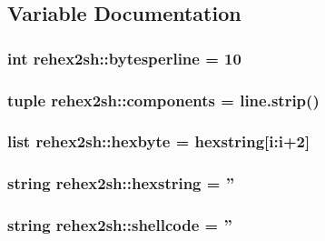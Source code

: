 \subsection{\-Variable \-Documentation}
\hypertarget{namespacerehex2sh_a6871a6d428039f71f95e8fafadae894e}{
\subsubsection[{bytesperline}]{\setlength{\rightskip}{0pt plus 5cm}int {\bf rehex2sh\-::bytesperline} = 10}}\label{namespacerehex2sh_a6871a6d428039f71f95e8fafadae894e}
\hypertarget{namespacerehex2sh_a46d30aa0b79379b0ae46b60e57e3a36b}{
\subsubsection[{components}]{\setlength{\rightskip}{0pt plus 5cm}tuple {\bf rehex2sh\-::components} = line.\-strip()}}\label{namespacerehex2sh_a46d30aa0b79379b0ae46b60e57e3a36b}
\hypertarget{namespacerehex2sh_aac23a21b6bd08055ad23d4b30b34367b}{
\subsubsection[{hexbyte}]{\setlength{\rightskip}{0pt plus 5cm}list {\bf rehex2sh\-::hexbyte} = {\bf hexstring}\mbox{[}i\-:i+2\mbox{]}}}\label{namespacerehex2sh_aac23a21b6bd08055ad23d4b30b34367b}
\hypertarget{namespacerehex2sh_ae94339789f7c777c35511b0d5e15f985}{
\subsubsection[{hexstring}]{\setlength{\rightskip}{0pt plus 5cm}string {\bf rehex2sh\-::hexstring} = ''}}\label{namespacerehex2sh_ae94339789f7c777c35511b0d5e15f985}
\hypertarget{namespacerehex2sh_adc89af6fa1de3747a0439ec88e8e947f}{
\subsubsection[{shellcode}]{\setlength{\rightskip}{0pt plus 5cm}string {\bf rehex2sh\-::shellcode} = ''}}\label{namespacerehex2sh_adc89af6fa1de3747a0439ec88e8e947f}
